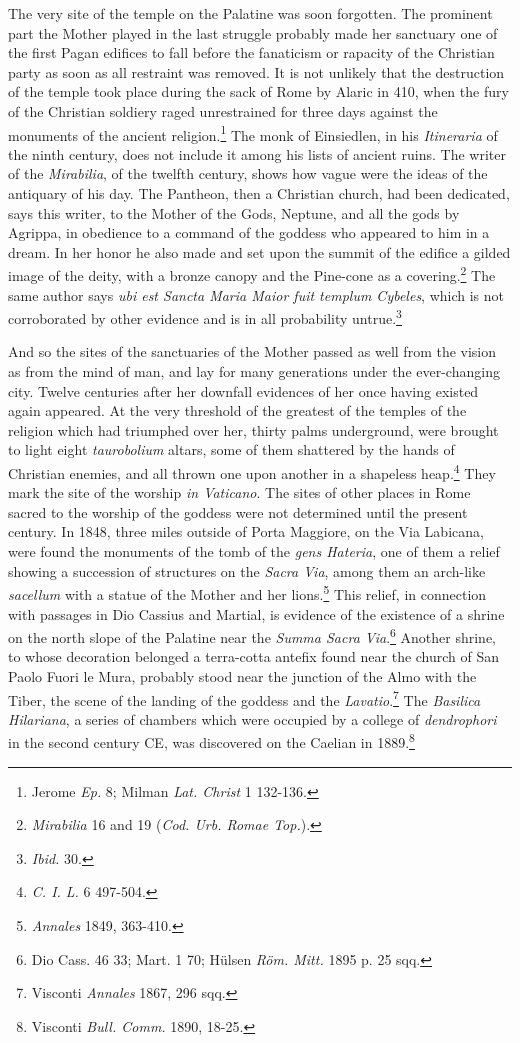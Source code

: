 \documentclass[a4paper, 11pt, oneside, polutonikogreek, french]{article}
\begin{document}
The very site of the temple on the Palatine was soon forgotten. The prominent part the Mother played in the last struggle probably made her sanctuary one of the first Pagan edifices to fall before the fanaticism or rapacity of the Christian party as soon as all restraint was removed. It is not unlikely that the destruction of the temple took place during the sack of Rome by Alaric in 410, when the fury of the Christian soldiery raged unrestrained for three days against the monuments of the ancient religion.\footnote{Jerome \emph{Ep.} 8; Milman \emph{Lat. Christ} 1 132-136.} The monk of Einsiedlen, in his \emph{Itineraria} of the ninth century, does not include it among his lists of ancient ruins. The writer of the \emph{Mirabilia}, of the twelfth century, shows how vague were the ideas of the antiquary of his day. The Pantheon, then a Christian church, had been dedicated, says this writer, to the Mother of the Gods, Neptune, and all the gods by Agrippa, in obedience to a command of the goddess who appeared to him in a dream. In her honor he also made and set upon the summit of the edifice a gilded image of the deity, with a bronze canopy and the Pine-cone as a covering.\footnote{\emph{Mirabilia} 16 and 19 (\emph{Cod. Urb. Romae Top.}).} The same author says \emph{ubi est Sancta Maria Maior fuit templum Cybeles}, which is not corroborated by other evidence and is in all probability untrue.\footnote{\emph{Ibid.} 30.}

And so the sites of the sanctuaries of the Mother passed as well from the vision as from the mind of man, and lay for many generations under the ever-changing city. Twelve centuries after her downfall evidences of her once having existed again appeared. At the very threshold of the greatest of the temples of the religion which had triumphed over her, thirty palms underground, were brought to light eight \emph{taurobolium} altars, some of them shattered by the hands of Christian enemies, and all thrown one upon another in a shapeless heap.\footnote{\emph{C. I. L.} 6 497-504.} They mark the site of the worship \emph{in Vaticano}. The sites of other places in Rome sacred to the worship of the goddess were not determined until the present century. In 1848, three miles outside of Porta Maggiore, on the Via Labicana, were found the monuments of the tomb of the \emph{gens Hateria}, one of them a relief showing a succession of structures on the \emph{Sacra Via}, among them an arch-like \emph{sacellum} with a statue of the Mother and her lions.\footnote{\emph{Annales} 1849, 363-410.} This relief, in connection with passages in Dio Cassius and Martial, is evidence of the existence of a shrine on the north slope of the Palatine near the \emph{Summa Sacra Via}.\footnote{Dio Cass. 46 33; Mart. 1 70; Hülsen \emph{Röm. Mitt.} 1895 p. 25 sqq.} Another shrine, to whose decoration belonged a terra-cotta antefix found near the church of San Paolo Fuori le Mura, probably stood near the junction of the Almo with the Tiber, the scene of the landing of the goddess and the \emph{Lavatio}.\footnote{Visconti \emph{Annales} 1867, 296 sqq.} The \emph{Basilica Hilariana}, a series of chambers which were occupied by a college of \emph{dendrophori} in the second century \textsc{CE}, was discovered on the Caelian in 1889.\footnote{Visconti \emph{Bull. Comm.} 1890, 18-25.}
\end{document}

